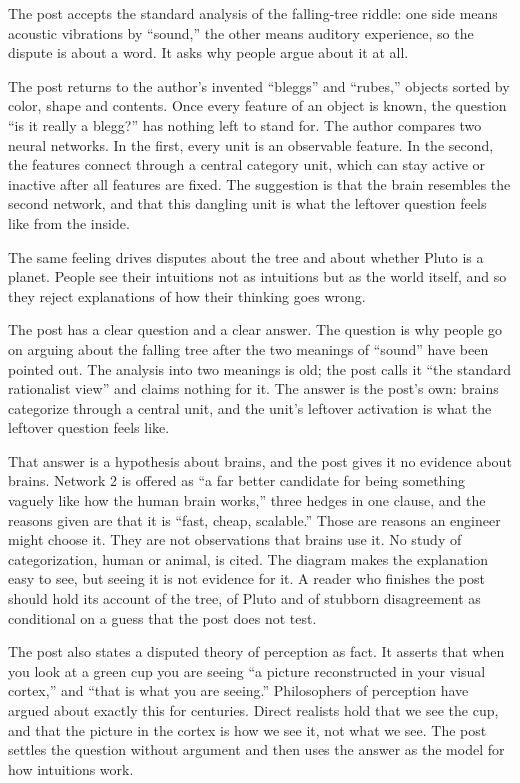 \begin{afterword}
\summaryhead

The post accepts the standard analysis of the falling-tree riddle: one side means acoustic vibrations by ``sound,'' the other means auditory experience, so the dispute is about a word. It asks why people argue about it at all.

The post returns to the author's invented ``bleggs'' and ``rubes,'' objects sorted by color, shape and contents. Once every feature of an object is known, the question ``is it really a blegg?'' has nothing left to stand for. The author compares two neural networks. In the first, every unit is an observable feature. In the second, the features connect through a central category unit, which can stay active or inactive after all features are fixed. The suggestion is that the brain resembles the second network, and that this dangling unit is what the leftover question feels like from the inside.

The same feeling drives disputes about the tree and about whether Pluto is a planet. People see their intuitions not as intuitions but as the world itself, and so they reject explanations of how their thinking goes wrong.

\responsehead

The post has a clear question and a clear answer. The question is why people go on arguing about the falling tree after the two meanings of ``sound'' have been pointed out. The analysis into two meanings is old; the post calls it ``the standard rationalist view'' and claims nothing for it. The answer is the post's own: brains categorize through a central unit, and the unit's leftover activation is what the leftover question feels like.

That answer is a hypothesis about brains, and the post gives it no evidence about brains. Network 2 is offered as ``a far better candidate for being something vaguely like how the human brain works,'' three hedges in one clause, and the reasons given are that it is ``fast, cheap, scalable.'' Those are reasons an engineer might choose it. They are not observations that brains use it. No study of categorization, human or animal, is cited. The diagram makes the explanation easy to see, but seeing it is not evidence for it. A reader who finishes the post should hold its account of the tree, of Pluto and of stubborn disagreement as conditional on a guess that the post does not test.

The post also states a disputed theory of perception as fact. It asserts that when you look at a green cup you are seeing ``a picture reconstructed in your visual cortex,'' and ``that is what you are seeing.'' Philosophers of perception have argued about exactly this for centuries. Direct realists hold that we see the cup, and that the picture in the cortex is how we see it, not what we see. The post settles the question without argument and then uses the answer as the model for how intuitions work.


\end{afterword}
